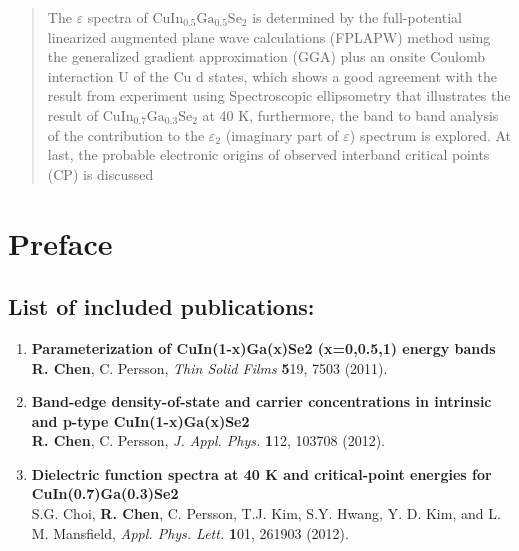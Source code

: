 \documentclass[a4paper, 12pt, titlepage,oneside,drop]{kthesis}
\begin{document}
\begin{abstract}
\noindent The $\varepsilon$ spectra of $\mathrm {CuIn_{0.5}Ga_{0.5}Se_2}$ is determined by the full-potential linearized augmented plane wave calculations (FPLAPW)
method using the generalized gradient approximation (GGA) plus an onsite Coulomb interaction U of the Cu d states, which shows a good agreement with the result from
experiment using Spectroscopic ellipsometry that illustrates the result of $\mathrm {CuIn_{0.7}Ga_{0.3}Se_2}$ at 40 K, furthermore, the band to band analysis of the
contribution to the ${\varepsilon_2 }$ (imaginary part of $\varepsilon$) spectrum is explored. At last, the probable electronic origins of observed interband critical
points (CP) is discussed

\end{abstract}

%

%


\newpage
\setcounter{page}{5}

\section*{Preface} 

\subsection*{List of included publications:}

\begin{enumerate}
\renewcommand{\labelenumi}{\Roman{enumi}}
\item{} \textbf{Parameterization of CuIn(1-x)Ga(x)Se2 (x=0,0.5,1) energy bands }
\\\textbf{R. Chen}, C. Persson, \textit{Thin Solid Films} {\textbf 519}, 7503 (2011).

\item{}\textbf{Band-edge density-of-state and carrier concentrations in intrinsic and p-type CuIn(1-x)Ga(x)Se2}
\\\textbf{R. Chen}, C. Persson, \textit{J. Appl. Phys.} {\textbf 112}, 103708 (2012).

\item{} \textbf{Dielectric function spectra at 40 K and critical-point energies for CuIn(0.7)Ga(0.3)Se2}
\\ S.G. Choi, \textbf{R. Chen}, C. Persson, T.J. Kim, S.Y. Hwang, Y. D. Kim, and L. M. Mansfield,
\textit{Appl. Phys. Lett. } {\textbf 101}, 261903 (2012).

\end{enumerate}
\end{document}
